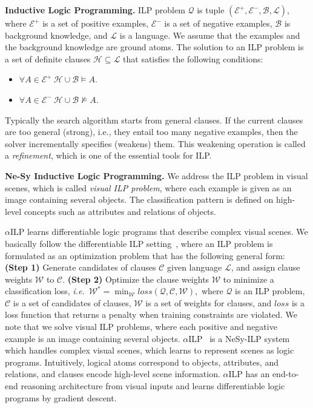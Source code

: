 \documentclass[
]{ceurart}
\newcommand{\ie}{\emph{i.e.}~}
\begin{document}
	
	\textbf{Inductive Logic Programming.}
	ILP problem $\mathcal{Q}$ is tuple $(\mathcal{E}^+, \mathcal{E}^-, \mathcal{B}, \mathcal{L})$, where
	$\mathcal{E}^+$ is a set of positive examples, $\mathcal{E}^-$ is a set of negative examples, $\mathcal{B}$ is background knowledge, 
	and $\mathcal{L}$ is a language. We assume that the examples and the background knowledge are ground atoms.
	The solution to an ILP problem is a set of definite clauses $\mathcal{H} \subseteq \mathcal{L}$
	that satisfies the following conditions:
	\begin{itemize}
		\item $\forall A \in \mathcal{E}^+ ~ \mathcal{H} \cup \mathcal{B}  \models A$.
		\item $\forall A \in \mathcal{E}^-  ~\mathcal{H} \cup \mathcal{B} \not \models A.$
	\end{itemize}
	Typically the search algorithm starts from general clauses. If the current clauses are too general (strong), i.e., they entail too many negative examples, then the solver incrementally specifies (weakens) them.
	This weakening operation is called a {\it refinement}, which is one of the essential tools for ILP.
	
	
	\textbf{Ne-Sy Inductive Logic Programming.} We address the ILP problem in visual scenes, which is called \emph{visual ILP problem}, where each example is given as an image containing several objects.
	The classification pattern is defined on high-level concepts such as attributes and relations of objects.
	
	$\alpha$ILP learns differentiable logic programs that describe complex visual scenes.
	We basically follow the differentiable ILP setting~\cite{Evans2018,Shindo21}, where an ILP problem is formulated as an optimization problem that has the following general form:
	\textbf{(Step 1)} Generate candidates of clauses $\mathcal{C}$ given language $\mathcal{L}$, and assign clause weights $\mathcal{W}$ to $\mathcal{C}$. 
	\textbf{(Step 2)} Optimize the clause weights $\mathcal{W}$ to minimize a classification loss, \ie  $\mathcal{W}^*= \min_\mathcal{W} \mathit{loss}(\mathcal{Q}, \mathcal{C}, \mathcal{W}),$
	where $\mathcal{Q}$ is an ILP problem, $\mathcal{C}$ is a set of candidates of clauses, $\mathcal{W}$ is a set of weights for clauses, and $\mathit{loss}$ is a loss function that returns a penalty when training constraints are violated.
	We note that we solve visual ILP problems, where each positive and negative example is an image containing several objects.
	$\alpha$ILP~\cite{Shindo2023alphailp} is a NeSy-ILP system which handles complex visual scenes, which learns to represent scenes as logic programs. Intuitively, logical atoms correspond to objects, attributes, and relations, and clauses encode high-level scene information. $\alpha$ILP has an end-to-end reasoning architecture from visual inputs and learns differentiable logic programs by gradient descent.
	
\end{document}
